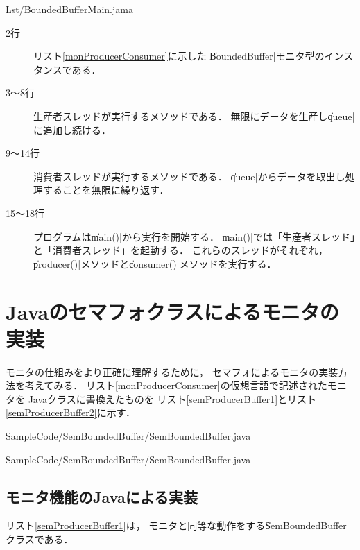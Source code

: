
                {Lst/BoundedBufferMain.jama}

\begin{description}
\item [2行] 
  リスト\ref{monProducerConsumer}に示した
  \|BoundedBuffer|モニタ型のインスタンスである．
\item [3〜8行]
  生産者スレッドが実行するメソッドである．
  無限にデータを生産し\|queue|に追加し続ける．
\item [9〜14行]
  消費者スレッドが実行するメソッドである．
  \|queue|からデータを取出し処理することを無限に繰り返す．
\item [15〜18行]
  プログラムは\|main()|から実行を開始する．
  \|main()|では「生産者スレッド」と「消費者スレッド」を起動する．
  これらのスレッドがそれぞれ，
  \|producer()|メソッドと\|consumer()|メソッドを実行する．
\end{description}

\section{Javaのセマフォクラスによるモニタの実装}
モニタの仕組みをより正確に理解するために，
セマフォによるモニタの実装方法を考えてみる．
リスト\ref{monProducerConsumer}の仮想言語で記述されたモニタを
Javaクラスに書換えたものを
リスト\ref{semProducerBuffer1}とリスト\ref{semProducerBuffer2}に示す．


                {SampleCode/SemBoundedBuffer/SemBoundedBuffer.java}


                {SampleCode/SemBoundedBuffer/SemBoundedBuffer.java}

\subsection{モニタ機能のJavaによる実装}
リスト\ref{semProducerBuffer1}は，
モニタと同等な動作をする\|SemBoundedBuffer|クラスである．

